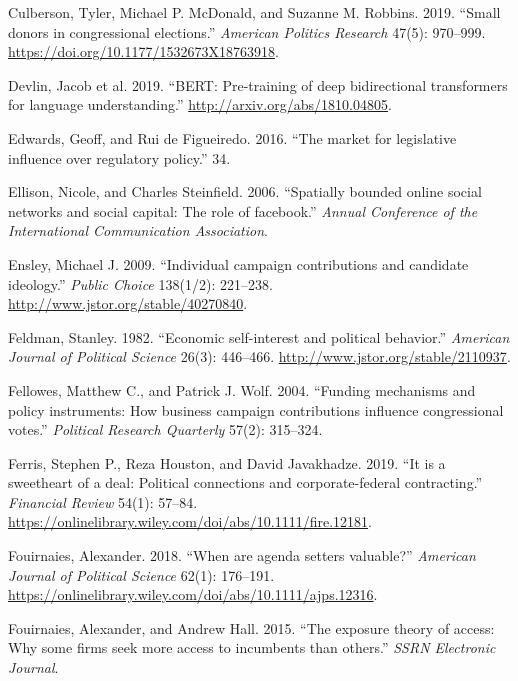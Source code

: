 \documentclass[12pt,]{article}
\begin{document}
\leavevmode\hypertarget{ref-culberson2019}{}%
Culberson, Tyler, Michael P. McDonald, and Suzanne M. Robbins. 2019.
``Small donors in congressional elections.'' \emph{American Politics
Research} 47(5): 970--999.
\url{https://doi.org/10.1177/1532673X18763918}.

\leavevmode\hypertarget{ref-bert}{}%
Devlin, Jacob et al. 2019. ``BERT: Pre-training of deep bidirectional
transformers for language understanding.''
\url{http://arxiv.org/abs/1810.04805}.

\leavevmode\hypertarget{ref-edwards2016}{}%
Edwards, Geoff, and Rui de Figueiredo. 2016. ``The market for
legislative influence over regulatory policy.'' 34.

\leavevmode\hypertarget{ref-ellison2006}{}%
Ellison, Nicole, and Charles Steinfield. 2006. ``Spatially bounded
online social networks and social capital: The role of facebook.''
\emph{Annual Conference of the International Communication Association}.

\leavevmode\hypertarget{ref-ensley2009}{}%
Ensley, Michael J. 2009. ``Individual campaign contributions and
candidate ideology.'' \emph{Public Choice} 138(1/2): 221--238.
\url{http://www.jstor.org/stable/40270840}.

\leavevmode\hypertarget{ref-feldman1982}{}%
Feldman, Stanley. 1982. ``Economic self-interest and political
behavior.'' \emph{American Journal of Political Science} 26(3):
446--466. \url{http://www.jstor.org/stable/2110937}.

\leavevmode\hypertarget{ref-fellowes2004}{}%
Fellowes, Matthew C., and Patrick J. Wolf. 2004. ``Funding mechanisms
and policy instruments: How business campaign contributions influence
congressional votes.'' \emph{Political Research Quarterly} 57(2):
315--324.

\leavevmode\hypertarget{ref-ferris2019}{}%
Ferris, Stephen P., Reza Houston, and David Javakhadze. 2019. ``It is a
sweetheart of a deal: Political connections and corporate-federal
contracting.'' \emph{Financial Review} 54(1): 57--84.
\url{https://onlinelibrary.wiley.com/doi/abs/10.1111/fire.12181}.

\leavevmode\hypertarget{ref-fouirnaies2018}{}%
Fouirnaies, Alexander. 2018. ``When are agenda setters valuable?''
\emph{American Journal of Political Science} 62(1): 176--191.
\url{https://onlinelibrary.wiley.com/doi/abs/10.1111/ajps.12316}.

\leavevmode\hypertarget{ref-fouirnaies2015}{}%
Fouirnaies, Alexander, and Andrew Hall. 2015. ``The exposure theory of
access: Why some firms seek more access to incumbents than others.''
\emph{SSRN Electronic Journal}.
\end{document}

